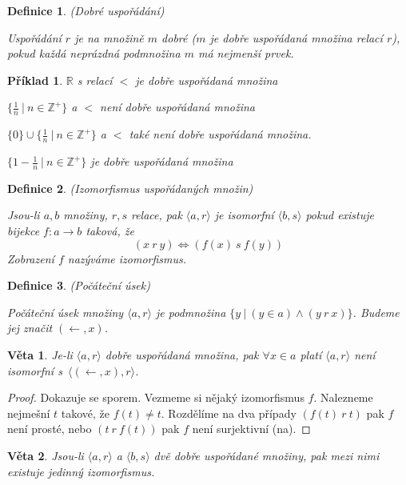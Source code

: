 \documentclass[a4paper,10pt,titlepage]{article} \usepackage[utf8]{inputenc}
\newtheorem{theorem}{Věta}
\newtheorem{define}{Definice}
\newtheorem*{example}{Příklad}
\begin{document}
\begin{define}
(Dobré uspořádání)

Uspořádání $r$ je na množině $m$ dobré ($m$ je dobře uspořádaná množina relací $r$), pokud každá neprázdná podmnožina $m$ má nejmenší prvek.
\end{define}

\begin{example}
$\mathbb{R}$ s relací $<$ je dobře uspořádaná množina

$\{\frac{1}{n}\ |\ n \in \mathbb{Z}^+\}$ a $<$ není dobře uspořádaná množina

$ \{0\} \cup \{\frac{1}{n}\ |\ n \in \mathbb{Z}^+\}$ a $<$ také není dobře uspořádaná množina.

$\{1-\frac{1}{n}\ |\ n \in \mathbb{Z}^+\}$ je dobře uspořádaná množina
\end{example}

\begin{define}
(Izomorfismus uspořádaných množin)

Jsou-li $a,b$ množiny, $r,s$ relace, pak $\langle a , r \rangle $ je isomorfní $\langle b , s \rangle $ pokud existuje bijekce $f: a \rightarrow b$ taková, že
\[
(x\ r\ y) \Leftrightarrow (f(x)\ s\ f(y))
\]
Zobrazení $f$ nazýváme izomorfismus.
\end{define}

\begin{define}
(Počáteční úsek)

Počáteční úsek množiny $\langle a , r \rangle $ je podmnožina $\{ y\ |\ (y \in a) \wedge (y\ r\ x)\}$.
Budeme jej značit $(\leftarrow , x)$.
\end{define}

\begin{theorem}\label{l1}
Je-li $\langle a , r \rangle $ dobře uspořádaná množina, pak $\forall x \in a$ platí $\langle a , r \rangle $ není isomorfní s~$\langle (\leftarrow,x), r \rangle$.
\end{theorem}

\begin{proof}
Dokazuje se sporem. Vezmeme si nějaký izomorfismus $f$.
Nalezneme nejmešní $t$ takové, že $f(t) \neq t$.
Rozdělíme na dva případy $(f(t)\ r\ t)$ pak $f$ není prosté, nebo
$(t\ r\ f(t))$ pak $f$ není surjektivní (na).
\end{proof}

\begin{theorem}\label{l2}
Jsou-li $\langle a , r \rangle $ a $\langle b , s \rangle $ dvě dobře uspořádané množiny, pak mezi nimi existuje jedinný izomorfismus.
\end{theorem}
\end{document}
